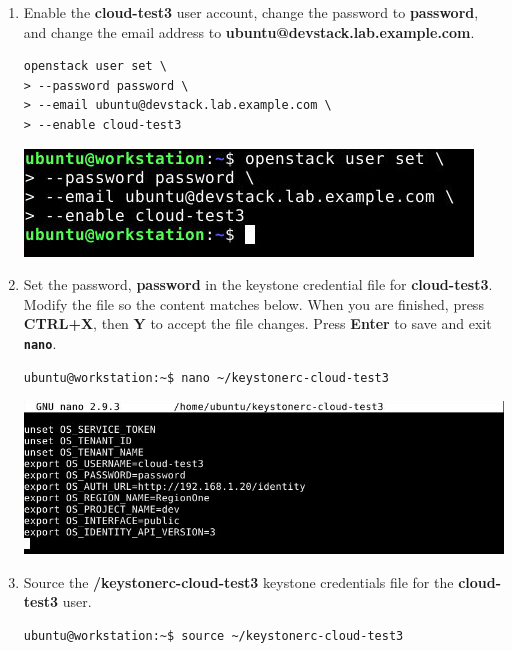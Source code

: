 \documentclass[letterpaper, 12pt]{article}
\begin{document}
\begin{enumerate}
    \item Enable the \textbf{cloud-test3} user account, change the password to \textbf{password}, and change the email
    address to \textbf{ubuntu@devstack.lab.example.com}.    
\begin{lstlisting}
openstack user set \
> --password password \
> --email ubuntu@devstack.lab.example.com \
> --enable cloud-test3
\end{lstlisting}

    \begin{center}
        \includegraphics[width=\linewidth]{images/part4/step13.png}
    \end{center}

    \item Set the password, \textbf{password} in the keystone credential file for \textbf{cloud-test3}. Modify the file
    so the content matches below. When you are finished, press \textbf{CTRL+X}, then \textbf{Y} to accept the file
    changes. Press \textbf{Enter} to save and exit \textbf{\texttt{nano}}.
\begin{lstlisting}
ubuntu@workstation:~$ nano ~/keystonerc-cloud-test3
\end{lstlisting}

    \begin{center}
        \includegraphics[width=\linewidth]{images/part4/step14.png}
    \end{center}

    \item Source the \textbf{\texttildemid/keystonerc-cloud-test3} keystone credentials file for the
    \textbf{cloud-test3} user.
\begin{lstlisting}
ubuntu@workstation:~$ source ~/keystonerc-cloud-test3
\end{lstlisting}


\end{enumerate}
\end{document}
